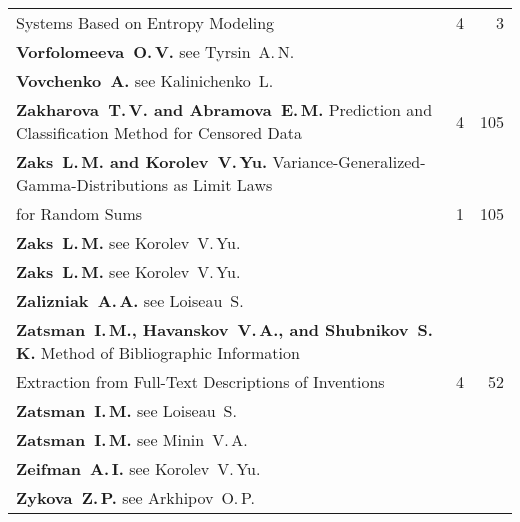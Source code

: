 {\begin{tabular}{p{397pt}rr}
\hspace*{23pt}Systems Based on Entropy Modeling\dotfill&4&3\\
\textbf{Vorfolomeeva~O.\,V.} see Tyrsin~A.\,N.&&\\
\textbf{Vovchenko~A.} see Kalinichenko~L.&&\\
\textbf{Zakharova~T.\,V. and Abramova~E.\,M.}
Prediction and Classification Method for Censored Data&4&105\\
\textbf{Zaks~L.\,M. and Korolev~V.\,Yu.}
Variance-Generalized-Gamma-Distributions as Limit Laws\linebreak
\vspace*{-12pt}\\
\hspace*{23pt}for Random Sums\dotfill&1&105\\
\textbf{Zaks~L.\,M.} see Korolev~V.\,Yu.&&\\
\textbf{Zaks~L.\,M.} see Korolev~V.\,Yu.&&\\
\textbf{Zalizniak~A.\,A.} see Loiseau~S.&&\\
\textbf{Zatsman~I.\,M., Havanskov~V.\,A., and Shubnikov~S.\,K.}
Method of Bibliographic Information\linebreak
\vspace*{-12pt}\\
\hspace*{23pt}Extraction from Full-Text Descriptions of
Inventions\dotfill&4&52\\
\textbf{Zatsman~I.\,M.} see Loiseau~S.&&\\
\textbf{Zatsman~I.\,M.} see Minin~V.\,A.&&\\
\textbf{Zeifman~A.\,I.} see Korolev~V.\,Yu.&&\\
\textbf{Zykova~Z.\,P.} see Arkhipov~O.\,P. &&\\
\end{tabular}
}

\def\leftfootline{\small{\textbf{\thepage}
\hfill INFORMATIKA I EE PRIMENENIYA~--- INFORMATICS AND APPLICATIONS\ \ \ 2013\ 
\ \ volume~7\ \ \ issue\ 4}
}%
 \def\rightfootline{\small{INFORMATIKA I EE PRIMENENIYA~--- INFORMATICS AND APPLICATIONS\ \ \ 2013\ \ \ volume~7\ \ \ issue\ 4
\hfill \textbf{\thepage}}}

 \label{end\stat}

\newpage